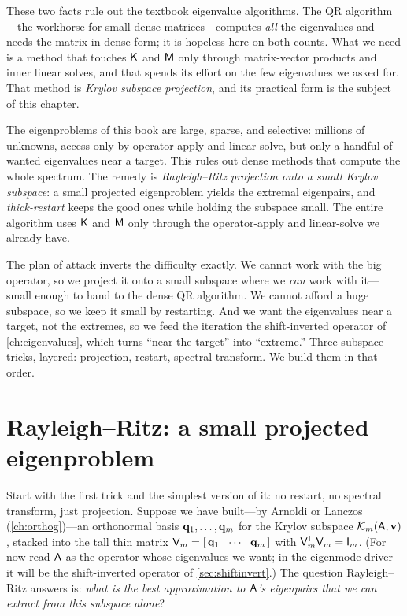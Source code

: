These two facts rule out the textbook eigenvalue algorithms. The QR
algorithm---the workhorse for small dense matrices---computes \emph{all} the
eigenvalues and needs the matrix in dense form; it is hopeless here on both counts. What
we need is a method that touches $\mathsf{K}$ and $\mathsf{M}$ only through matrix-vector
products and inner linear solves, and that spends its effort on the few eigenvalues we
asked for. That method is \emph{Krylov subspace projection}, and its practical form is
the subject of this chapter.

\begin{keyidea}
The eigenproblems of this book are large, sparse, and selective: millions of unknowns,
access only by operator-apply and linear-solve, but only a handful of wanted
eigenvalues near a target. This rules out dense methods that compute the whole spectrum.
The remedy is \emph{Rayleigh--Ritz projection onto a small Krylov subspace}: a small
projected eigenproblem yields the extremal eigenpairs, and \emph{thick-restart} keeps
the good ones while holding the subspace small. The entire algorithm uses $\mathsf{K}$ and
$\mathsf{M}$ only through the operator-apply and linear-solve we already have.
\end{keyidea}

The plan of attack inverts the difficulty exactly. We cannot work with the big operator,
so we project it onto a small subspace where we \emph{can} work with it---small enough
to hand to the dense QR algorithm. We cannot afford a huge subspace, so we keep it small
by restarting. And we want the eigenvalues near a target, not the extremes, so we feed
the iteration the shift-inverted operator of \cref{ch:eigenvalues}, which turns ``near
the target'' into ``extreme.'' Three subspace tricks, layered: projection, restart,
spectral transform. We build them in that order.

\section{Rayleigh--Ritz: a small projected eigenproblem}
\label{sec:rayleighritz}

Start with the first trick and the simplest version of it: no restart, no spectral
transform, just projection. Suppose we have built---by Arnoldi or Lanczos
(\cref{ch:orthog})---an orthonormal basis $\mathbf{q}_1, \dots, \mathbf{q}_m$ for the Krylov subspace
$\mathcal{K}_m(\mathsf{A}, \mathbf{v})$, stacked into the tall thin matrix
$\mathsf{V}_m = [\,\mathbf{q}_1 \mid \cdots \mid \mathbf{q}_m\,]$ with $\mathsf{V}_m^{\!\top}\mathsf{V}_m =
\mathsf{I}_m$. (For now read $\mathsf{A}$ as the operator whose eigenvalues we want; in the
eigenmode driver it will be the shift-inverted operator of \cref{sec:shiftinvert}.) The
question Rayleigh--Ritz answers is: \emph{what is the best approximation to $\mathsf{A}$'s
eigenpairs that we can extract from this subspace alone}?

